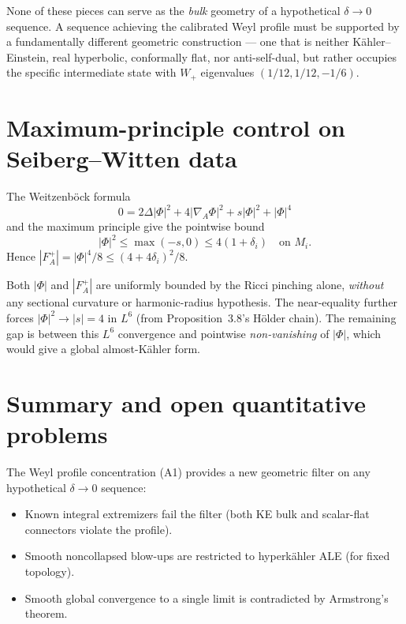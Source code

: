 None of these pieces can serve as the \emph{bulk} geometry of a
hypothetical \(\delta\to0\) sequence.  A sequence achieving the calibrated
Weyl profile must be supported by a fundamentally different geometric
construction --- one that is neither K\"ahler--Einstein, real hyperbolic,
conformally flat, nor anti-self-dual, but rather occupies the specific
intermediate state with \(W_+\) eigenvalues \((1/12,1/12,-1/6)\).

\section{Maximum-principle control on Seiberg--Witten data}

The Weitzenb\"ock formula
\[
  0=2\Delta|\Phi|^2+4|\nabla_A\Phi|^2+s|\Phi|^2+|\Phi|^4
\]
and the maximum principle give the pointwise bound
\[
  |\Phi|^2\le\max(-s,0)\le4(1+\delta_i)\quad\text{on }M_i.
\]
Hence \(|F_A^+|=|\Phi|^4/8\le(4+4\delta_i)^2/8\).

Both \(|\Phi|\) and \(|F_A^+|\) are uniformly bounded by the Ricci
pinching alone, \emph{without} any sectional curvature or harmonic-radius
hypothesis.  The near-equality further forces
\(|\Phi|^2\to|s|=4\) in \(L^6\) (from Proposition~3.8's H\"older
chain).  The remaining gap is between this \(L^6\) convergence and
pointwise \emph{non-vanishing} of \(|\Phi|\), which would give a
global almost-K\"ahler form.

\section{Summary and open quantitative problems}

The Weyl profile concentration (A1) provides a new geometric filter
on any hypothetical \(\delta\to0\) sequence:
\begin{itemize}
\item Known integral extremizers fail the filter (both KE bulk and
  scalar-flat connectors violate the profile).
\item Smooth noncollapsed blow-ups are restricted to hyperk\"ahler ALE
  (for fixed topology).
\item Smooth global convergence to a single limit is contradicted
  by Armstrong's theorem.
\end{itemize}

